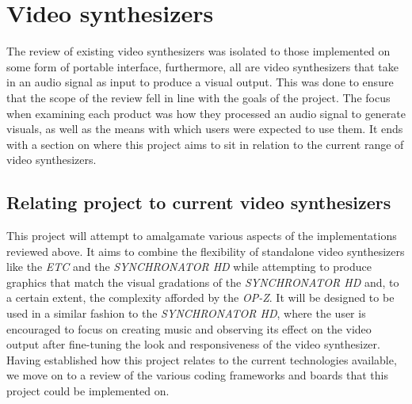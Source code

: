 \documentclass[../initial_thesis.tex]{subfiles}
\begin{document}
\section{Video synthesizers} \label{sec:vsynths}
The review of existing video synthesizers was isolated to those implemented on some form of portable interface, furthermore, all are video synthesizers that take in an audio signal as input to produce a visual output. This was done to ensure that the scope of the review fell in line with the goals of the project. The focus when examining each product was how they processed an audio signal to generate visuals, as well as the means with which users were expected to use them. It ends with a section on where this project aims to sit in relation to the current range of video synthesizers.




\subsection{Relating project to current video synthesizers}
This project will attempt to amalgamate various aspects of the implementations reviewed above. It aims to combine the flexibility of standalone video synthesizers like the \textit{ETC} and the \textit{SYNCHRONATOR HD} while attempting to produce graphics that match the visual gradations of the \textit{SYNCHRONATOR HD} and, to a certain extent, the complexity afforded by the \textit{OP-Z}. It will be designed to be used in a similar fashion to the \textit{SYNCHRONATOR HD}, where the user is encouraged to focus on creating music and observing its effect on the video output after fine-tuning the look and responsiveness of the video synthesizer. Having established how this project relates to the current technologies available, we move on to a review of the various coding frameworks and boards that this project could be implemented on.
\end{document}

